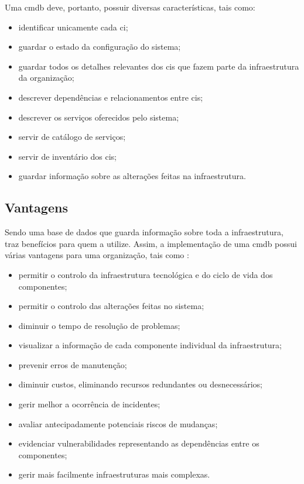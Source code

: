 \documentclass[
  oneside,
  11pt, a4paper,
  footinclude=true,
  headinclude=true,
  cleardoublepage=empty
]{scrbook}
\begin{document}
Uma \gls{cmdb} deve, portanto, possuir diversas características, tais como:
\begin{itemize}
    \item identificar unicamente cada \gls{ci};
    \item guardar o estado da configuração do sistema;
    \item guardar todos os detalhes relevantes dos \glspl{ci} que fazem parte da infraestrutura da organização;
    \item descrever dependências e relacionamentos entre \glspl{ci};
    \item descrever os serviços oferecidos pelo sistema;
    \item servir de catálogo de serviços;
    \item servir de inventário dos \glspl{ci};
    \item guardar informação sobre as alterações feitas na infraestrutura.
\end{itemize}

\subsection{Vantagens}

Sendo uma base de dados que guarda informação sobre toda a infraestrutura, traz benefícios para quem a utilize. Assim, a implementação de uma \gls{cmdb} possui várias vantagens para uma organização, tais como \cite{implementingitil} \cite{cmdbsystems}:
\begin{itemize}
    \item permitir o controlo da infraestrutura tecnológica e do ciclo de vida dos componentes;
    \item permitir o controlo das alterações feitas no sistema;
    \item diminuir o tempo de resolução de problemas;
    \item visualizar a informação de cada componente individual da infraestrutura;
    \item prevenir erros de manutenção;
    \item diminuir custos, eliminando recursos redundantes ou desnecessários;
    \item gerir melhor a ocorrência de incidentes;
    \item avaliar antecipadamente potenciais riscos de mudanças;
    \item evidenciar vulnerabilidades representando as dependências entre os componentes;
    \item gerir mais facilmente infraestruturas mais complexas.
\end{itemize}
\end{document}
